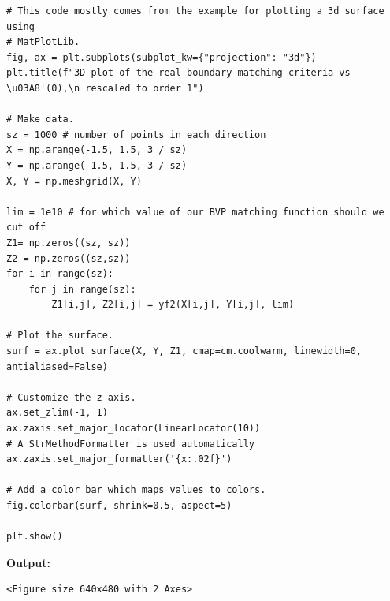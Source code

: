 \documentclass{article}
\begin{document}
\begin{lstlisting}
# This code mostly comes from the example for plotting a 3d surface using 
# MatPlotLib. 
fig, ax = plt.subplots(subplot_kw={"projection": "3d"})
plt.title(f"3D plot of the real boundary matching criteria vs \u03A8'(0),\n rescaled to order 1")

# Make data.
sz = 1000 # number of points in each direction
X = np.arange(-1.5, 1.5, 3 / sz)
Y = np.arange(-1.5, 1.5, 3 / sz)
X, Y = np.meshgrid(X, Y)

lim = 1e10 # for which value of our BVP matching function should we cut off
Z1= np.zeros((sz, sz))
Z2 = np.zeros((sz,sz))
for i in range(sz):
    for j in range(sz):
        Z1[i,j], Z2[i,j] = yf2(X[i,j], Y[i,j], lim)

# Plot the surface.
surf = ax.plot_surface(X, Y, Z1, cmap=cm.coolwarm, linewidth=0, antialiased=False)

# Customize the z axis.
ax.set_zlim(-1, 1)
ax.zaxis.set_major_locator(LinearLocator(10))
# A StrMethodFormatter is used automatically
ax.zaxis.set_major_formatter('{x:.02f}')

# Add a color bar which maps values to colors.
fig.colorbar(surf, shrink=0.5, aspect=5)

plt.show()\end{lstlisting}

\textbf{Output:}\begin{verbatim}
<Figure size 640x480 with 2 Axes>
\end{verbatim}
\end{document}
